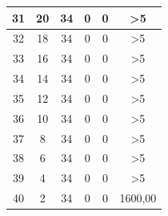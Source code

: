\begin{longtable}{|c|c|c|c|c|c|}
 		31                                           & 20                     & 34                    & 0                     & 0                      & >5                                              \\ \hline
 		32                                           & 18                     & 34                    & 0                     & 0                      & >5                                              \\ \hline
 		33                                           & 16                     & 34                    & 0                     & 0                      & >5                                            \\ \hline
 		34                                           & 14                     & 34                    & 0                     & 0                      & >5                                             \\ \hline
 		35                                           & 12                     & 34                    & 0                     & 0                      & >5                                             \\ \hline
 		36                                           & 10                     & 34                    & 0                     & 0                      & >5                                             \\ \hline
 		37                                           & 8                      & 34                    & 0                     & 0                      & >5                                            \\ \hline
 		38                                           & 6                      & 34                    & 0                     & 0                      & >5                                             \\ \hline
 		39                                           & 4                      & 34                    & 0                     & 0                      & >5                                             \\ \hline
 		40                                           & 2                      & 34                    & 0                     & 0                      & 1600,00                                            \\ \hline
 	\end{longtable}
